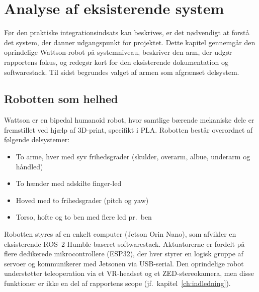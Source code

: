 \chapter{Analyse af eksisterende system}
\label{ch:analyse}

Før den praktiske integrationsindsats kan beskrives, er det nødvendigt at
forstå det system, der danner udgangspunkt for projektet. Dette kapitel
gennemgår den oprindelige Wattson-robot på systemniveau, beskriver den
arm, der udgør rapportens fokus, og redegør kort for den eksisterende
dokumentation og softwarestack. Til sidst begrundes valget af armen som
afgrænset delsystem.

\section{Robotten som helhed}

Wattson er en bipedal humanoid robot, hvor samtlige bærende mekaniske dele
er fremstillet ved hjælp af 3D-print, specifikt i PLA. Robotten består overordnet af følgende
delsystemer:

\begin{itemize}
    \item To arme, hver med syv frihedsgrader (skulder, overarm, albue,
          underarm og håndled)
    \item To hænder med adskilte finger-led
    \item Hoved med to frihedsgrader (pitch og yaw)
    \item Torso, hofte og to ben med flere led pr.\ ben
\end{itemize}

Robotten styres af en enkelt computer (Jetson Orin Nano), som
afvikler en eksisterende ROS~2 Humble-baseret softwarestack. Aktuatorerne
er fordelt på flere dedikerede mikrocontrollere (ESP32), der hver styrer
en logisk gruppe af servoer og kommunikerer med Jetsonen via USB-serial.
Den oprindelige robot understøtter teleoperation via et VR-headset og et
ZED-stereo\-kamera, men disse funktioner er ikke en del af rapportens scope
(jf.\ kapitel~\ref{ch:indledning}).

